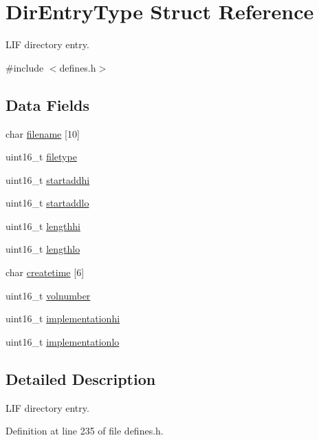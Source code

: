 \hypertarget{structDirEntryType}{}\section{Dir\+Entry\+Type Struct Reference}
\label{structDirEntryType}


L\+IF directory entry.  




{\ttfamily \#include $<$defines.\+h$>$}

\subsection*{Data Fields}
\begin{DoxyCompactItemize}
\item 
char \hyperlink{structDirEntryType_aa60fae0a6b7ba9c966cbcf46e555f396}{filename} \mbox{[}10\mbox{]}
\item 
uint16\+\_\+t \hyperlink{structDirEntryType_ada14562440087858ebf04bc4c81eedd2}{filetype}
\item 
uint16\+\_\+t \hyperlink{structDirEntryType_a0cab2915e9f864e25b24d298c36c11db}{startaddhi}
\item 
uint16\+\_\+t \hyperlink{structDirEntryType_aea0e798bb172b4bddf174ce339a4a54a}{startaddlo}
\item 
uint16\+\_\+t \hyperlink{structDirEntryType_ad7aaba7b01038bc8bacb096bd66fff08}{lengthhi}
\item 
uint16\+\_\+t \hyperlink{structDirEntryType_ad1cde25a0229866557cd5983c27fbd31}{lengthlo}
\item 
char \hyperlink{structDirEntryType_a627fd55537c73d4fee596b140e106c01}{createtime} \mbox{[}6\mbox{]}
\item 
uint16\+\_\+t \hyperlink{structDirEntryType_add9ab11f89586efb100471f6580e75c5}{volnumber}
\item 
uint16\+\_\+t \hyperlink{structDirEntryType_a27a15eea3264d44c9e93e3be77093151}{implementationhi}
\item 
uint16\+\_\+t \hyperlink{structDirEntryType_a8164d577c06fb7c312aaa4955d491449}{implementationlo}
\end{DoxyCompactItemize}


\subsection{Detailed Description}
L\+IF directory entry. 

Definition at line 235 of file defines.\+h.



